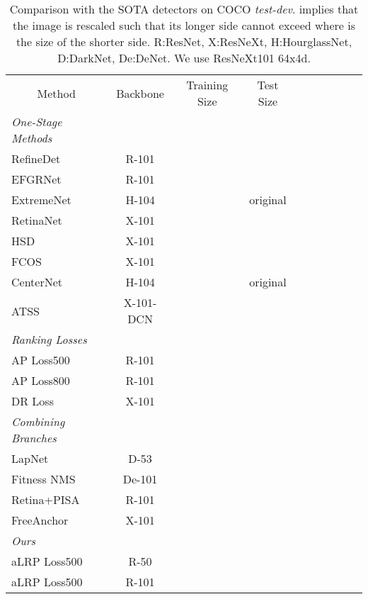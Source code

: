 \documentclass{article}
\newcommand{\cellcenter}[1]{\multicolumn{1}{|c|}{#1}}
\begin{document}
\begin{table}[t]
    \centering
    \footnotesize 
\caption{Comparison with the SOTA detectors on COCO \textit{test-dev}.  implies that the image is rescaled such that its longer side cannot exceed  where  is the size of the shorter side.  R:ResNet, X:ResNeXt, H:HourglassNet, D:DarkNet, De:DeNet. We use ResNeXt101 64x4d.}
    \label{tab:testdev}
    \setlength{\tabcolsep}{0.25em}
    \begin{tabular}{|l|c|c|c|c|c|c|c|c|c|} \hline
        \cellcenter{Method}&Backbone&Training Size&Test Size&&&& && \\ 
        \hhline{==========}
        \textit{One-Stage Methods}& & & & & & & & &\\
RefineDet \cite{AnchorRefine}&R-101&&&&&&&&\\
        EFGRNet \cite{EnrichedFeatureGuided}&R-101&&&&&&&&\\ 
ExtremeNet \cite{ExtremeNet}&H-104&&original&&&&&&\\
RetinaNet \cite{FocalLoss}&X-101&&&&&&&&\\
HSD \cite{HierarchicalShotDet} &X-101&&&&&&&&\\ 
FCOS \cite{FCOS}&X-101&&&&&&&&\\         
        CenterNet \cite{CenterNet}&H-104&&original&&&&&&\\          
        ATSS \cite{ATSS}&X-101-DCN&&&&&&&&\\        
        \hhline{==========}
        \textit{Ranking Losses}& & & & & & & & &\\  
AP Loss500 \cite{APLoss}&R-101&&&&&&&&\\
        AP Loss800 \cite{APLoss}&R-101&&&&&&&&\\
DR Loss \cite{DRLoss}&X-101&&&&&&&&\\        
        \hhline{==========}
        \textit{Combining Branches}& & & & & & & & &\\
        LapNet \cite{LapNet}&D-53&&&&&&&&\\ 
        Fitness NMS \cite{BoundedIoU}&De-101&&&&&&&&\\ 
        Retina+PISA \cite{PrimeSample}&R-101&&&&&&&&\\
        FreeAnchor \cite{FreeAnchor}&X-101&&&&&&&&\\
        \hhline{==========}
        \textit{Ours}& & & & & & & & &\\
aLRP Loss500&R-50&&&&&&&&\\  
        aLRP Loss500&R-101&&&&&&&&\\  

\end{tabular}
\end{table}
\end{document}

